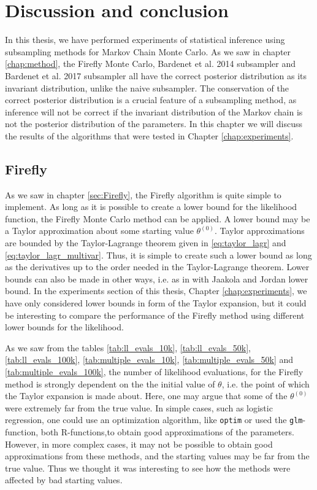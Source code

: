 \chapter{Discussion and conclusion}
In this thesis, we have performed experiments of statistical inference using subsampling methods for Markov Chain Monte Carlo. As we saw in chapter \ref{chap:method}, the Firefly Monte Carlo, Bardenet et al. 2014 subsampler and Bardenet et al. 2017 subsampler all have the correct posterior distribution as its invariant distribution, unlike the naive subsampler. The conservation of the correct posterior distribution is a crucial feature of a subsampling method,  as inference will not be correct if the invariant distribution of the Markov chain is not the posterior distribution of the parameters. In this chapter we will discuss the results of the algorithms that were tested in Chapter \ref{chap:experiments}. 

\section{Firefly}
As we saw in chapter \ref{sec:Firefly}, the Firefly algorithm is quite simple to implement. As long as it is possible to create a lower bound for the likelihood function, the Firefly Monte Carlo method can be applied. A lower bound may be a Taylor approximation about some starting value $\theta^{\left(0\right)}$.  Taylor approximations are bounded by the Taylor-Lagrange theorem given in  \eqref{eq:taylor_lagr} and \eqref{eq:taylor_lagr_multivar}. Thus, it is simple to create such a lower bound as long as the derivatives up to the order needed in the Taylor-Lagrange theorem. Lower bounds can also be made in other ways, i.e. as in  \cite{Maclaurin:1} with Jaakola and Jordan lower bound. In the experiments section of this thesis, Chapter \ref{chap:experiments}, we have only considered lower bounds in form of the Taylor expansion, but it could be interesting to compare the performance of the Firefly method using different lower bounds for the likelihood.

As we saw from the tables \ref{tab:ll_evals_10k}, \ref{tab:ll_evals_50k}, \ref{tab:ll_evals_100k}, \ref{tab:multiple_evals_10k}, \ref{tab:multiple_evals_50k} and \ref{tab:multiple_evals_100k},  the number of  likelihood evaluations, for the Firefly method is strongly dependent on the the initial value of $\theta$, i.e. the point of which the Taylor expansion is made about.
Here, one may argue that some of the $\theta^{\left(0\right)}$ were extremely far from the true value. In simple cases, such as logistic regression, one could use an optimization algorithm, like \texttt{optim} or used the \texttt{glm}-function, both R-functions,to obtain good approximations of the parameters. 
However, in more complex cases, it may not be possible to obtain good approximations from these methods, and the starting values may be far from the true value. 
Thus we thought it was interesting to see how the methods were affected by bad starting values. 

